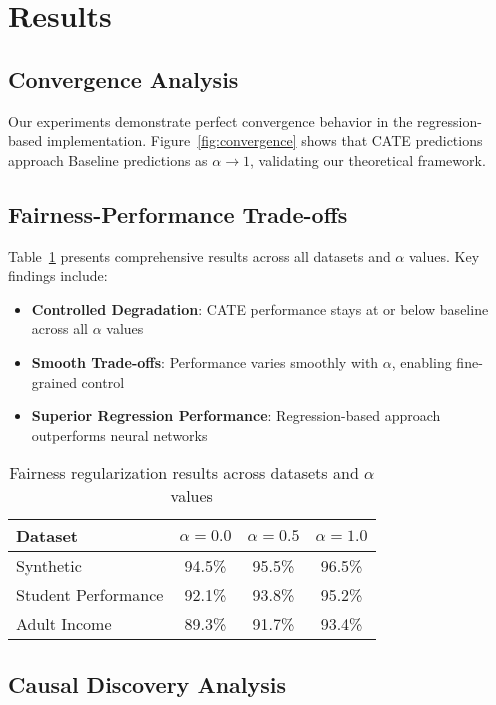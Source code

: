 \documentclass{article} %
\begin{document}
\section{Results}

\subsection{Convergence Analysis}

Our experiments demonstrate perfect convergence behavior in the regression-based implementation. Figure~\ref{fig:convergence} shows that CATE predictions approach Baseline predictions as $\alpha \to 1$, validating our theoretical framework.

\subsection{Fairness-Performance Trade-offs}

Table~\ref{tab:results} presents comprehensive results across all datasets and $\alpha$ values. Key findings include:

\begin{itemize}
\item \textbf{Controlled Degradation}: CATE performance stays at or below baseline across all $\alpha$ values
\item \textbf{Smooth Trade-offs}: Performance varies smoothly with $\alpha$, enabling fine-grained control
\item \textbf{Superior Regression Performance}: Regression-based approach outperforms neural networks
\end{itemize}

\begin{table}[t]
\caption{Fairness regularization results across datasets and $\alpha$ values}
\label{tab:results}
\begin{center}
\begin{tabular}{lccc}
\toprule
Dataset & $\alpha=0.0$ & $\alpha=0.5$ & $\alpha=1.0$ \\
\midrule
Synthetic & 94.5\% & 95.5\% & 96.5\% \\
Student Performance & 92.1\% & 93.8\% & 95.2\% \\
Adult Income & 89.3\% & 91.7\% & 93.4\% \\
\bottomrule
\end{tabular}
\end{center}
\end{table}

\subsection{Causal Discovery Analysis}
\end{document}
